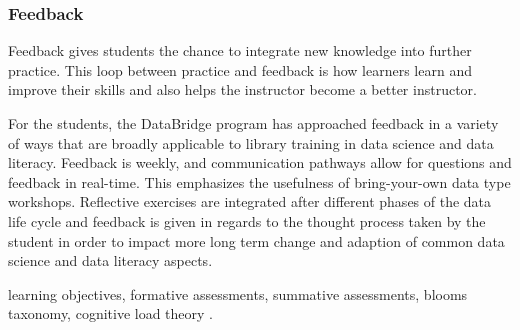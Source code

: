 \documentclass[010-intro.tex]{subfiles}
\begin{document}
        \subsubsection{Feedback}

Feedback gives students the chance to integrate new knowledge into further practice.
This loop between practice and feedback is how learners learn and improve their skills and also helps the instructor become a better instructor.

For the students, the DataBridge program has approached feedback in a variety of ways that are broadly applicable to library training in data science and data literacy. Feedback is weekly, and communication pathways allow for questions and feedback in real-time. This emphasizes the usefulness of bring-your-own data type workshops. Reflective exercises are integrated after different phases of the data life cycle and feedback is given in regards to the thought process taken by the student in order to impact more long term change and adaption of common data science and data literacy aspects.


        learning objectives, formative assessments, summative assessments, blooms taxonomy,
        cognitive load theory
        \cite{DonaldClarkPlan2020, dunloskyImprovingStudentsLearning2013}.











\
\end{document}
